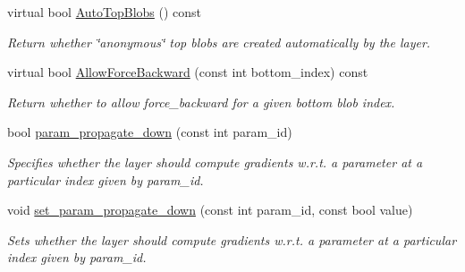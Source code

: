 \begin{DoxyCompactItemize}
virtual bool \mbox{\hyperlink{classcaffe_1_1_layer_a50130669e230a168d1f8fbbb8171f054}{Auto\+Top\+Blobs}} () const
\begin{DoxyCompactList}\small\item\em Return whether \char`\"{}anonymous\char`\"{} top blobs are created automatically by the layer. \end{DoxyCompactList}\item 
virtual bool \mbox{\hyperlink{classcaffe_1_1_layer_a1c0b2bffcd6d57e4bd49f820941badb6}{Allow\+Force\+Backward}} (const int bottom\+\_\+index) const
\begin{DoxyCompactList}\small\item\em Return whether to allow force\+\_\+backward for a given bottom blob index. \end{DoxyCompactList}\item 
bool \mbox{\hyperlink{classcaffe_1_1_layer_a1a3708013b0231e71d725252e10ce6e3}{param\+\_\+propagate\+\_\+down}} (const int param\+\_\+id)
\begin{DoxyCompactList}\small\item\em Specifies whether the layer should compute gradients w.\+r.\+t. a parameter at a particular index given by param\+\_\+id. \end{DoxyCompactList}\item 
\mbox{\label{classcaffe_1_1_layer_a9a6fcb843803ed556f0a69cc2864379b}} 
void \mbox{\hyperlink{classcaffe_1_1_layer_a9a6fcb843803ed556f0a69cc2864379b}{set\+\_\+param\+\_\+propagate\+\_\+down}} (const int param\+\_\+id, const bool value)
\begin{DoxyCompactList}\small\item\em Sets whether the layer should compute gradients w.\+r.\+t. a parameter at a particular index given by param\+\_\+id. \end{DoxyCompactList}\end{DoxyCompactItemize}
